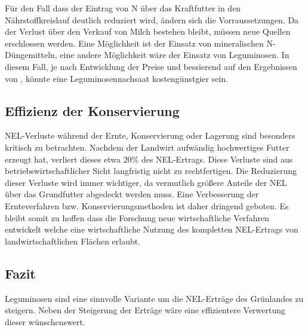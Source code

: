 Für den Fall dass der Eintrag von N über das Kraftfutter in den Nährstoffkreislauf deutlich reduziert wird, ändern sich die Vorraussetzungen.
Da der Verlust über den Verkauf von Milch bestehen bleibt, müssen neue Quellen erschlossen werden.
Eine Möglichkeit ist der Einsatz von mineralischen N-Düngemitteln, eine andere Möglichkeit wäre der Einsatz von Leguminosen.
In diesem Fall, je nach Entwicklung der Preise und bessierend auf den Ergebnissen von \textcite[33-36]{weggler2050leguminosen}, könnte eine Leguminosennachsaat kostengünstgier sein.


\subsection{Effizienz der Konservierung}
\label{sub:konservierung}
\ac{NEL}-Verluste während der Ernte, Konservierung oder Lagerung sind besonders kritisch zu betrachten.
Nachdem der Landwirt aufwändig hochwertiges Futter erzeugt hat, verliert dieses etwa 20\% des \ac{NEL}-Ertrags.
Diese Verluste sind aus betriebswirtschaftlicher Sicht langfristig nicht zu rechtfertigen.
Die Reduzierung dieser Verluste wird immer wichtiger, da vermutlich größere Anteile der \ac{NEL} über das Grundfutter abgedeckt werden muss.
Eine Verbesserung der Ernteverfahren bzw. Konservierungsmethoden ist daher dringend geboten.
Es bleibt somit zu hoffen dass die Forschung neue wirtschaftliche Verfahren entwickelt welche eine wirtschaftliche Nutzung des kompletten \ac{NEL}-Ertrags von landwirtschaftlichen Flächen erlaubt.

\subsection{Fazit}
\label{subsec:fazit}
Leguminosen sind eine sinnvolle Variante um die \ac{NEL}-Erträge des Grünlandes zu steigern.
Neben der Steigerung der Erträge wäre eine effizientere Verwertung dieser wünschenswert.
